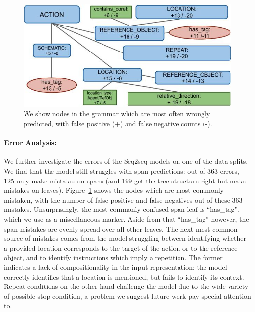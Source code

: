 \begin{figure}[t]
    \centering
    \includegraphics[width=\linewidth ]{figures/ModelMistakesNarrow.jpg}
    \caption{\label{fig:mistakes} We show nodes in the grammar which are most often wrongly predicted, with false positive (+) and false negative counts (-).}
\end{figure}

\paragraph{Error Analysis: } We further investigate the errors of the Seq2seq models on one of the data splits. We find that the model still struggles with span predictions: out of 363 errors, 125 only make mistakes on spans (and 199 get the tree structure right but make mistakes on leaves). Figure~\ref{fig:mistakes} shows the nodes which are most commonly mistaken, with the number of false positive and false negatives out of these 363 mistakes. Unsurprisingly, the most commonly confused span leaf is ``has\_tag'', which we use as a miscellaneous marker. Aside from that ``has\_tag'' however, the span mistakes are evenly spread over all other leaves. The next most common source of mistakes comes from the model struggling between identifying whether a provided location corresponds to the target of the action or to the reference object, and to identify instructions which imply a repetition. The former indicates a lack of compositionality in the input representation: the model correctly identifies that a location is mentioned, but fails to identify its context. Repeat conditions on the other hand challenge the model due to the wide variety of possible stop condition, a problem we suggest future work pay special attention to.


